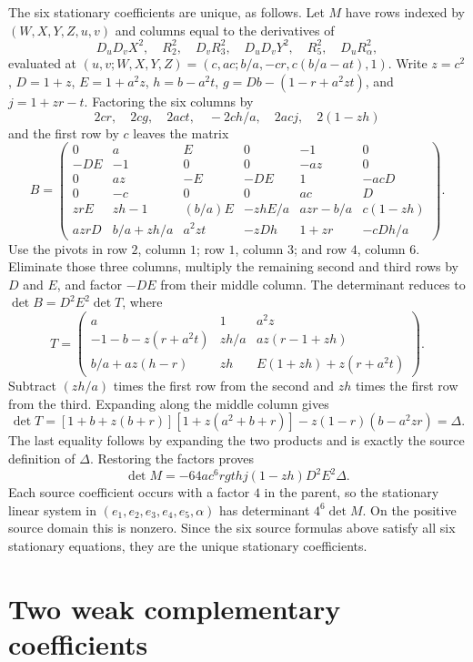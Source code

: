 The six stationary coefficients are unique, as follows.
Let $M$ have rows indexed by $(W,X,Y,Z,u,v)$ and columns equal to the
derivatives of
\[
D_uD_vX^2,\quad R_2^2,\quad D_vR_3^2,\quad
D_uD_vY^2,\quad R_5^2,\quad D_uR_\alpha^2,
\]
evaluated at $(u,v;W,X,Y,Z)=(c,ac;b/a,-cr,c(b/a-at),1)$.
Write $z=c^2$, $D=1+z$, $E=1+a^2z$, $h=b-a^2t$,
$g=Db-(1-r+a^2zt)$, and $j=1+zr-t$.
Factoring the six columns by
\[
2cr,\quad2cg,\quad2act,\quad-2ch/a,\quad2acj,
\quad2(1-zh)
\]
and the first row by $c$ leaves the matrix
\[
B=\begin{pmatrix}
0&a&E&0&-1&0\\
-DE&-1&0&0&-az&0\\
0&az&-E&-DE&1&-acD\\
0&-c&0&0&ac&D\\
zrE&zh-1&(b/a)E&-zhE/a&azr-b/a&c(1-zh)\\
azrD&b/a+zh/a&a^2zt&-zDh&1+zr&-cDh/a
\end{pmatrix}.
\]
Use the pivots in row $2$, column $1$; row $1$, column $3$; and
row $4$, column $6$.  Eliminate those three columns, multiply the
remaining second and third rows by $D$ and $E$, and factor $-DE$
from their middle column.  The determinant reduces to
$\det B=D^2E^2\det T$, where
\[
T=\begin{pmatrix}
a&1&a^2z\\
-1-b-z(r+a^2t)&zh/a&az(r-1+zh)\\
b/a+az(h-r)&zh&E(1+zh)+z(r+a^2t)
\end{pmatrix}.
\]
Subtract $(zh/a)$ times the first row from the second and $zh$ times
the first row from the third.  Expanding along the middle column gives
\[
\det T=[1+b+z(b+r)][1+z(a^2+b+r)]
-z(1-r)(b-a^2zr)=\Delta.
\]
The last equality follows by expanding the two products and is exactly
the source definition of $\Delta$.  Restoring the factors proves
\begin{equation}
\det M=-64a c^6rgt h j(1-zh)D^2E^2\Delta.
\label{eq:c2-entry-determinant}
\end{equation}
Each source coefficient occurs with a factor $4$ in the parent, so the
stationary linear system in $(e_1,e_2,e_3,e_4,e_5,\alpha)$ has determinant
$4^6\det M$.  On the positive source domain this is nonzero.  Since the
six source formulas above satisfy all six stationary equations,
they are the unique stationary coefficients.

\section{Two weak complementary coefficients}
